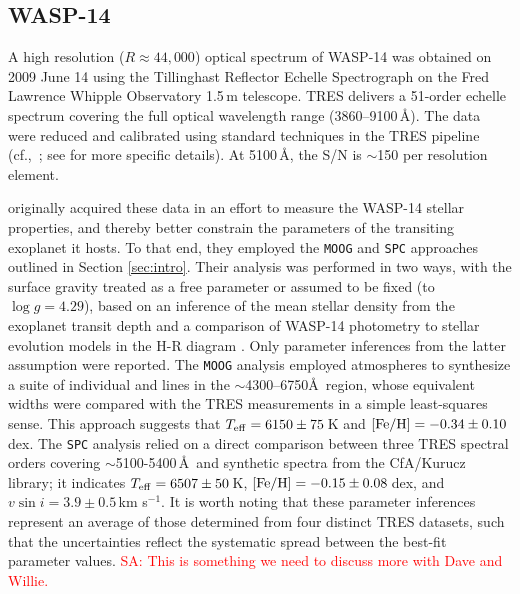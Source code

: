 \documentclass[iop,floatfix]{emulateapj}
\newcommand{\comm}[1]{ \textcolor{red}{SA: #1}}
\begin{document}
\subsection{WASP-14} \label{subsec:wasp}

A high resolution ($R\approx44,000$) optical spectrum of WASP-14 was obtained on 2009 June 14 
using the Tillinghast Reflector Echelle Spectrograph \citep[TRES;][]{furesz08} on the Fred Lawrence 
Whipple Observatory 1.5\,m telescope.  TRES delivers a 51-order echelle spectrum covering the 
full optical wavelength range (3860--9100\,\AA).  The data were reduced and calibrated using 
standard techniques in the TRES pipeline (cf.,~\citealt{buchhave10}; see \citealt{torres12} for more 
specific details).  At 5100\,\AA, the S/N is $\sim$150 per resolution element.  

\citet{torres12} originally acquired these data in an effort to measure the WASP-14 stellar 
properties, and thereby better constrain the parameters of the transiting exoplanet it hosts.  To 
that end, they employed the {\tt MOOG} and {\tt SPC} approaches outlined in Section 
\ref{sec:intro}.  Their analysis was performed in two ways, with the surface gravity treated as a 
free parameter or assumed to be fixed (to $\log g = 4.29$), based on an inference of the mean 
stellar density from the exoplanet transit depth and a comparison of WASP-14 photometry to stellar 
evolution models in the H-R diagram \citep{joshi09}.  Only parameter inferences from the latter 
assumption were reported.  The {\tt MOOG} analysis employed \citet{kurucz93} atmospheres to 
synthesize a suite of individual  and  lines in the $\sim$4300--6750\AA\ 
region, whose equivalent widths were compared with the TRES measurements in a simple least-squares 
sense.  This approach suggests that $T_{\rm eff} = 6150\pm75$\,K and $[{\rm Fe/H}] = 
-0.34\pm0.10$\,dex.  The {\tt SPC} analysis relied on a direct comparison between three TRES 
spectral orders covering $\sim$5100-5400\,\AA\ and synthetic spectra from the {\sc CfA/Kurucz} 
library; it indicates $T_{\rm eff} = 6507\pm50$\,K, $[{\rm Fe/H}] = -0.15\pm0.08$\,dex, and $v \sin 
i = 3.9\pm0.5$\,km s$^{-1}$.  It is worth noting that these parameter inferences represent an 
average of those determined from four distinct TRES datasets, such that the uncertainties reflect 
the systematic spread between the best-fit parameter values. \comm{This is something we need to 
discuss more with Dave and Willie.}
\end{document}
